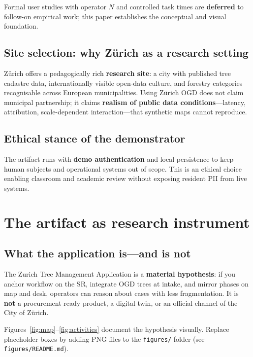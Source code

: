 \documentclass[12pt,a4paper]{article}
\newcommand{\appname}{Zurich Tree Management Application}
\begin{document}
Formal user studies with operator $N$ and controlled task times are \textbf{deferred} to follow-on empirical work; this paper establishes the conceptual and visual foundation.

\subsection{Site selection: why Zürich as a research setting}

Zürich offers a pedagogically rich \textbf{research site}: a city with published tree cadastre data, internationally visible open-data culture, and forestry categories recognisable across European municipalities. Using Zürich OGD does not claim municipal partnership; it claims \textbf{realism of public data conditions}---latency, attribution, scale-dependent interaction---that synthetic maps cannot reproduce.

\subsection{Ethical stance of the demonstrator}

The artifact runs with \textbf{demo authentication} and local persistence to keep human subjects and operational systems out of scope. This is an ethical choice enabling classroom and academic review without exposing resident PII from live systems.

\section{The artifact as research instrument}
\label{sec:artifact}

\subsection{What the application is---and is not}

The \appname{} is a \textbf{material hypothesis}: if you anchor workflow on the SR, integrate OGD trees at intake, and mirror phases on map and desk, operators can reason about cases with less fragmentation. It is \textbf{not} a procurement-ready product, a digital twin, or an official channel of the City of Zürich.

Figures~\ref{fig:map}--\ref{fig:activities} document the hypothesis visually. Replace placeholder boxes by adding PNG files to the \texttt{figures/} folder (see \texttt{figures/README.md}).
\end{document}
